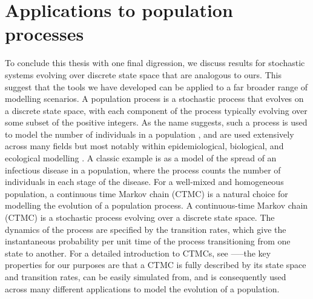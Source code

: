 \section{Applications to population processes}
To conclude this thesis with one final digression, we discuss results for stochastic systems evolving over discrete state space that are analogous to ours.
This suggest that the tools we have developed can be applied to a far broader range of modelling scenarios.
A population process is a stochastic process that evolves on a discrete state space, with each component of the process typically evolving over some subset of the positive integers.
As the name suggests, such a process is used to model the number of individuals in a population \citep{Kendall_1949_StochasticProcessesPopulation}, and are used extensively across many fields but most notably within epidemiological, biological, and ecological modelling \citep{Brauer_2008_CompartmentalModelsEpidemiology}.
A classic example is as a model of the spread of an infectious disease in a population, where the process counts the number of individuals in each stage of the disease.
For a well-mixed and homogeneous population, a continuous time Markov chain (CTMC) is a natural choice for modelling the evolution of a population process.
A continuous-time Markov chain (CTMC) is a stochastic process evolving over a discrete state space. The dynamics of the process are specified by the transition rates, which give the instantaneous probability per unit time of the process transitioning from one state to another.
For a detailed introduction to CTMCs, see \citet{Anderson_1991_ContinuousTimeMarkovChains}—--the key properties for our purposes are that a CTMC is fully described by its state space and transition rates, can be easily simulated from, and is consequently used across many different applications to model the evolution of a population.

